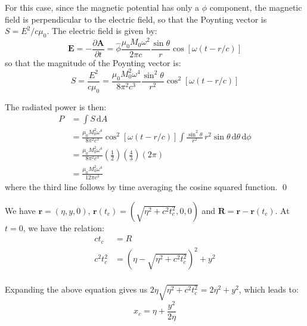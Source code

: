 \documentclass[12pt]{article}
\begin{document}
For this case, since the magnetic potential has only a $\phi$ component, the magnetic field is perpendicular to the electric field, so that the Poynting vector is $S = E^{2}/c\mu_{0}$. The electric field is given by:
\begin{equation}
    \mathbf{E} = -\frac{\partial \mathbf{A}}{\partial t} = \hat{\phi} \frac{\mu_{0} M_{0} \omega^{2}}{2\pi c} \frac{\sin{\theta}}{r} \cos{\left[ \omega (t - r/c) \right]}
\end{equation}
so that the magnitude of the Poynting vector is:
\begin{equation}
    S = \frac{E^{2}}{c\mu_{0}} = \frac{\mu_{0} M_{0}^{2} \omega^{4}}{8\pi^{2} c^{3}} \frac{\sin^{2}{\theta}}{r^{2}} \cos^{2}{\left[ \omega (t - r/c) \right]}
\end{equation}

The radiated power is then:
\begin{equation}
    \begin{split}
        P &= \int S \, \mathrm{d}A \\
        &= \frac{\mu_{0} M_{0}^{2} \omega^{4}}{8\pi^{2} c^{3}} \cos^{2}{\left[ \omega (t - r/c) \right]} \int \frac{\sin^{2}{\theta}}{r^{2}} \, r^{2} \sin{\theta} \, \mathrm{d}\theta \, \mathrm{d}\phi \\
        &= \frac{\mu_{0} M_{0}^{2} \omega^{4}}{8\pi^{2} c^{3}} \left( \frac{1}{2} \right) \left( \frac{4}{3} \right) (2\pi) \\
        &= \frac{\mu_{0} M_{0}^{2} \omega^{4}}{12\pi c^{3}}
    \end{split}
\end{equation}
where the third line follows by time averaging the cosine squared function.
\qed


We have $\mathbf{r} = (\eta, y, 0)$, $\mathbf{r}(t_{c}) = (\sqrt{\eta^{2} + c^{2} t_{c}^{2}}, 0, 0)$ and $\mathbf{R} = \mathbf{r} - \mathbf{r}(t_{c})$. At $t = 0$, we have the relation:
\begin{equation}
    \begin{split}
        c t_{c} &= R \\
        c^{2} t_{c}^{2} &= (\eta - \sqrt{\eta^{2} + c^{2} t_{c}^{2}})^{2} + y^{2} \\
    \end{split}
\end{equation}

Expanding the above equation gives us $2\eta \sqrt{\eta^{2} + c^{2} t_{c}^{2}} = 2\eta^{2} + y^{2}$, which leads to:
\begin{equation}
    x_{c} = \eta + \frac{y^{2}}{2\eta}
\end{equation}
\end{document}
